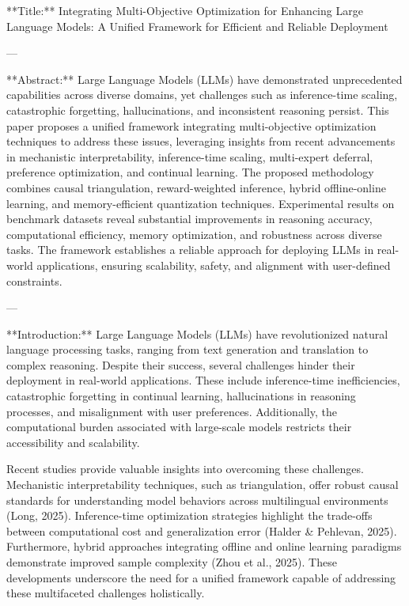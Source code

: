 **Title:**  
Integrating Multi-Objective Optimization for Enhancing Large Language Models: A Unified Framework for Efficient and Reliable Deployment  

---

**Abstract:**  
Large Language Models (LLMs) have demonstrated unprecedented capabilities across diverse domains, yet challenges such as inference-time scaling, catastrophic forgetting, hallucinations, and inconsistent reasoning persist. This paper proposes a unified framework integrating multi-objective optimization techniques to address these issues, leveraging insights from recent advancements in mechanistic interpretability, inference-time scaling, multi-expert deferral, preference optimization, and continual learning. The proposed methodology combines causal triangulation, reward-weighted inference, hybrid offline-online learning, and memory-efficient quantization techniques. Experimental results on benchmark datasets reveal substantial improvements in reasoning accuracy, computational efficiency, memory optimization, and robustness across diverse tasks. The framework establishes a reliable approach for deploying LLMs in real-world applications, ensuring scalability, safety, and alignment with user-defined constraints.  

---

**Introduction:**  
Large Language Models (LLMs) have revolutionized natural language processing tasks, ranging from text generation and translation to complex reasoning. Despite their success, several challenges hinder their deployment in real-world applications. These include inference-time inefficiencies, catastrophic forgetting in continual learning, hallucinations in reasoning processes, and misalignment with user preferences. Additionally, the computational burden associated with large-scale models restricts their accessibility and scalability.

Recent studies provide valuable insights into overcoming these challenges. Mechanistic interpretability techniques, such as triangulation, offer robust causal standards for understanding model behaviors across multilingual environments (Long, 2025). Inference-time optimization strategies highlight the trade-offs between computational cost and generalization error (Halder & Pehlevan, 2025). Furthermore, hybrid approaches integrating offline and online learning paradigms demonstrate improved sample complexity (Zhou et al., 2025). These developments underscore the need for a unified framework capable of addressing these multifaceted challenges holistically.

